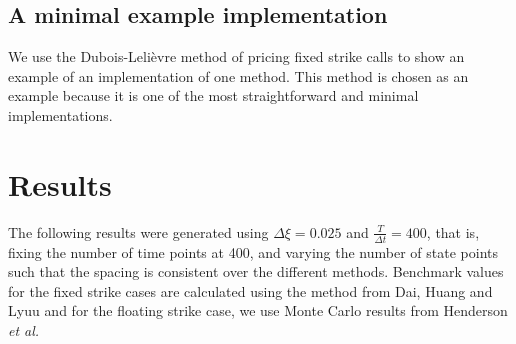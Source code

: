 \documentclass{article}
\begin{document}
\subsection{A minimal example implementation}

We use the Dubois-Leli\`{e}vre method of pricing fixed strike calls to show an example of an implementation of one method. This method is chosen as an example because it is one of the most straightforward and minimal implementations.
\scriptsize

\normalsize

\section{Results}
The following results were generated using \(\Delta\xi = 0.025\) and \(\frac{T}{\Delta t} = 400\), that is, fixing the number of time points at 400, and varying the number of state points such that the spacing is consistent over the different methods. Benchmark values for the fixed strike cases are calculated using the method from Dai, Huang and Lyuu \cite{dai_et_al} and for the floating strike case, we use Monte Carlo results from Henderson \textit{et al.} \cite{henderson_et_al}
\end{document}
